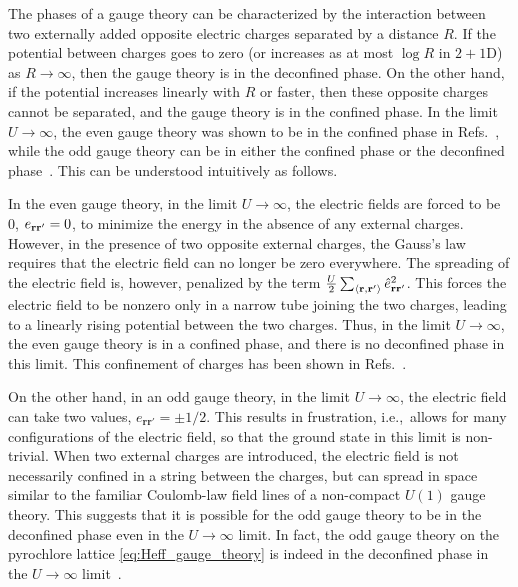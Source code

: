 \documentclass[twocolumn,superscriptaddress,amsmath,amssymb,aps,prx,nofootinbib]{revtex4-2}
\begin{document}
The phases of a gauge theory can be characterized by the interaction between two externally added opposite electric charges separated by a distance $R$. If the potential between charges goes to zero (or increases as at most $\log{R}$ in $2+1$D) as $R \rightarrow \infty$, then the gauge theory is in the deconfined phase. On the other hand, if the potential increases linearly with $R$ or faster, then these opposite charges cannot be separated, and the gauge theory is in the confined phase. In the limit $U\rightarrow \infty$, the even gauge theory was shown to be in the confined phase in Refs.~\cite{polyakovCompactGaugeFields1975, wilsonConfinementQuarks1974}, while the odd gauge theory can be in either the confined phase or the deconfined phase~\cite{hermele2004}. This can be understood intuitively as follows.

In the even gauge theory, in the limit $U \rightarrow \infty$, the electric fields are forced to be 0, $e_{\vb{r}\vb{r}'} = 0$, to minimize the energy in the absence of any external charges. However, in the presence of two opposite external charges,  the Gauss's law requires that the electric field can no longer be zero everywhere. The spreading of the electric field is, however, penalized by the term $\frac{U}{2} \sum_{\langle \vb{r},\vb{r'} \rangle } \hat{e}_{\vb{r}\vb{r}'}^2$. This forces the electric field to be nonzero  only in  a narrow tube joining the two charges, leading to a linearly rising potential between the two charges. Thus, in the limit $U \rightarrow \infty$,  the even gauge theory is in a confined phase, and there is no deconfined phase in this limit. This confinement of charges has been shown in Refs.~\cite{polyakovCompactGaugeFields1975,polyakov1977,wilsonConfinementQuarks1974,kogutIntroductionLatticeGauge1979}.

On the other hand, in an odd gauge theory, in the limit $U \rightarrow \infty$, the electric field can take two values, $e_{\mathbf{r}\mathbf{r}'} = \pm 1/2$. This results in frustration, i.e.,~allows for many configurations of the electric field, so that the ground state in this limit is non-trivial. When two external charges are introduced, the electric field is not necessarily confined in a string between the charges, but can spread in space similar to the familiar Coulomb-law field lines of a non-compact $U(1)$ gauge theory. This suggests that it is possible for the odd gauge theory to be in the deconfined phase even in the $U\rightarrow \infty$ limit. In fact, the odd gauge theory on the pyrochlore lattice \eqref{eq:Heff_gauge_theory} is indeed in the deconfined phase in the $U \rightarrow \infty$ limit~\cite{banerjee2008, shannon2012, Sikora2009}.
\end{document}
